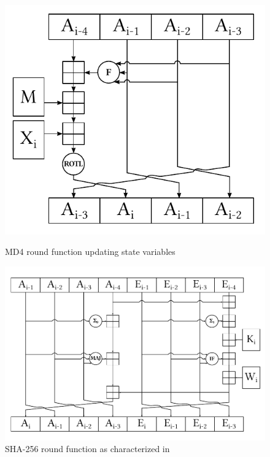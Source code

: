 \begin{figure}[p]
  \begin{center}
    \includegraphics{img/md4.pdf}
    \caption{MD4 round function updating state variables}
    \label{fig:md4-round-function}
  \end{center}
  \begin{center}
    \includegraphics[width=\textwidth]{img/sha256.pdf}
    \caption{SHA-256 round function as characterized in~\cite{analysisSHA256}}
    \label{fig:sha256-round-function}
  \end{center}
\end{figure}










